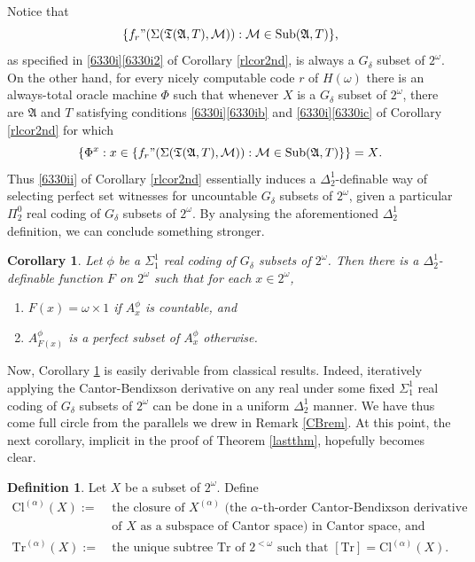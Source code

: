 \documentclass[12pt, twoside]{memoir}
\numberwithin{equation}{section}
\newtheorem{cor}[thm]{Corollary}
\theoremstyle{definition}
\newtheorem{defi}[thm]{Definition}
\theoremstyle{remark}
\theoremstyle{definition}
\theoremstyle{definition}
\theoremstyle{definition}
\theoremstyle{remark}
\begin{document}
Notice that 
\begin{equation*}
    \{f_r" (\Sigma(\mathfrak{T}(\mathfrak{A}, T), \mathcal{M})) : \mathcal{M} \in \mathrm{Sub}(\mathfrak{A}, T)\} \text{,}
\end{equation*}
as specified in \ref{6330i}\ref{6330i2} of Corollary \ref{rlcor2nd}, is always a $G_{\delta}$ subset of $2^{\omega}$. On the other hand, for every nicely computable code $r$ of $H(\omega)$ there is an always-total oracle machine $\Phi$ such that whenever $X$ is a $G_{\delta}$ subset of $2^{\omega}$, there are $\mathfrak{A}$ and $T$ satisfying conditions \ref{6330i}\ref{6330ib} and \ref{6330i}\ref{6330ic} of Corollary \ref{rlcor2nd} for which
\begin{equation*}
    \{\Phi^x : x \in \{f_r" (\Sigma(\mathfrak{T}(\mathfrak{A}, T), \mathcal{M})) : \mathcal{M} \in \mathrm{Sub}(\mathfrak{A}, T)\}\} = X \text{.}
\end{equation*}
Thus \ref{6330ii} of Corollary \ref{rlcor2nd} essentially induces a $\Delta^1_2$-definable way of selecting perfect set witnesses for uncountable $G_{\delta}$ subsets of $2^{\omega}$, given a particular $\Pi^0_2$ real coding of $G_{\delta}$ subsets of $2^{\omega}$. By analysing the aforementioned $\Delta^1_2$ definition, we can conclude something stronger.

\begin{cor}\label{cor6335}
Let $\phi$ be a $\Sigma^1_1$ real coding of $G_{\delta}$ subsets of $2^{\omega}$. Then there is a $\Delta^1_2$-definable function $F$ on $2^{\omega}$ such that for each $x \in 2^{\omega}$, 
\begin{enumerate}[label=(\arabic*)]
    \item $F(x) = \omega \times 1$ if $A^{\phi}_x$ is countable, and
    \item $A^{\phi}_{F(x)}$ is a perfect subset of $A^{\phi}_x$ otherwise.
\end{enumerate}
\end{cor}

Now, Corollary \ref{cor6335} is easily derivable from classical results. Indeed, iteratively applying the Cantor-Bendixson derivative on any real under some fixed $\Sigma^1_1$ real coding of $G_{\delta}$ subsets of $2^{\omega}$ can be done in a uniform $\Delta^1_2$ manner. We have thus come full circle from the parallels we drew in Remark \ref{CBrem}. At this point, the next corollary, implicit in the proof of Theorem \ref{lastthm}, hopefully becomes clear.

\begin{defi}\label{def6336}
Let $X$ be a subset of $2^{\omega}$. Define
\begin{align*}
    \mathrm{Cl}^{(\alpha)}(X) := \ & \text{the closure of } X^{(\alpha)} \text{ (the } \alpha \text{-th-order Cantor-Bendixson derivative} \\
    & \text{of } X \text{ as a subspace of Cantor space) in Cantor space, and} \\
    \mathrm{Tr}^{(\alpha)}(X) := \ & \text{the unique subtree } \mathrm{Tr} \text{ of } 2^{< \omega} \text{ such that } [\mathrm{Tr}] = \mathrm{Cl}^{(\alpha)}(X) \text{.}    
\end{align*}
\end{defi}
\end{document}
